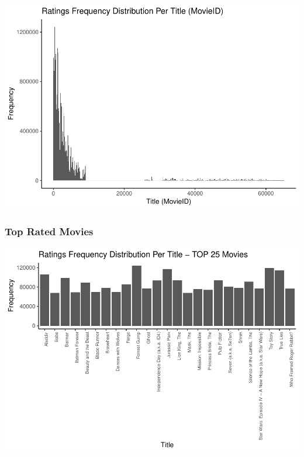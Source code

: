 \documentclass[]{article}
\begin{document}
\begin{center}\includegraphics{MovieLens_Project_Report_files/figure-latex/unnamed-chunk-19-1} \end{center}

\hypertarget{top-rated-movies}{%
\subsubsection{Top Rated Movies}\label{top-rated-movies}}

\begin{center}\includegraphics{MovieLens_Project_Report_files/figure-latex/unnamed-chunk-20-1} \end{center}
\end{document}
